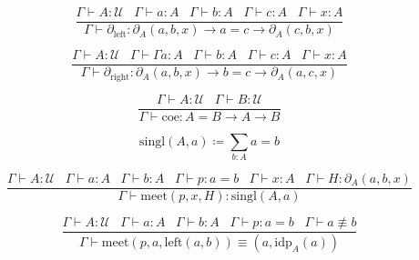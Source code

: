 \documentclass[a4paper,UKenglish,cleveref, autoref, thm-restate]{lipics-v2021}
\newcommand{\UU}{\ensuremath{\mathcal{U}}}
\begin{document}
\begin{equation*}
    \frac{\Gamma \vdash A : \UU \hspace{10pt} \Gamma \vdash a : A \hspace{10pt} \Gamma \vdash b : A \hspace{10pt} \Gamma \vdash c : A \hspace{10pt} \Gamma \vdash x : A}
         {\Gamma \vdash \partial_{\mathrm{left}} : \partial_A(a, b, x) \rightarrow a = c \rightarrow \partial_A(c, b, x)}
\end{equation*}

\begin{equation*}
    \frac{\Gamma \vdash A : \UU \hspace{10pt} \Gamma \vdash \Gamma a : A \hspace{10pt} \Gamma \vdash b : A \hspace{10pt} \Gamma \vdash c : A \hspace{10pt} \Gamma \vdash x : A}
         {\Gamma \vdash \partial_{\mathrm{right}} : \partial_A(a, b, x) \rightarrow b = c \rightarrow \partial_A(a, c, x)}
\end{equation*}

\begin{equation*}
    \frac{\Gamma \vdash A : \UU \hspace{10pt} \Gamma \vdash B : \UU}
         {\Gamma \vdash \mathrm{coe} : A = B \rightarrow A \rightarrow B}
\end{equation*}

\begin{equation*}
    \mathrm{singl}(A, a) \coloneqq \sum_{b : A} a = b
\end{equation*}

\begin{equation*}
    \frac{\Gamma \vdash A : \UU \hspace{10pt} \Gamma \vdash a : A \hspace{10pt} \Gamma \vdash b : A \hspace{10pt} \Gamma \vdash p : a = b \hspace{10pt} \Gamma \vdash x : A \hspace{10pt} \Gamma \vdash H : \partial_A(a, b, x)}
         {\Gamma \vdash \mathrm{meet}(p, x, H) : \mathrm{singl}(A, a)}
\end{equation*}

\begin{equation*}
    \frac{\Gamma \vdash A : \UU \hspace{10pt} \Gamma \vdash a : A \hspace{10pt} \Gamma \vdash b : A \hspace{10pt} \Gamma \vdash p : a = b \hspace{10pt} \Gamma \vdash a \not\equiv b}
         {\Gamma \vdash \mathrm{meet}(p, a, \mathrm{left}(a, b)) \equiv (a, \mathrm{idp}_A(a))}
\end{equation*}
\end{document}
